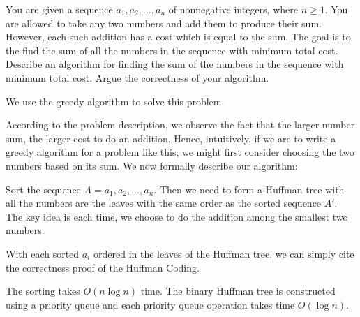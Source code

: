 \newpage
{} %

\problemdes

You are given a sequence $a_1, a_2, \dots, a_n$ of nonnegative integers, where $n \geq 1$. You are allowed to take any two numbers and add them to produce their sum. However, each such addition has a cost which is equal to the sum. The goal is to the find the sum of all the numbers in the sequence with minimum total cost. Describe an algorithm for finding the sum of the numbers in the sequence with minimum total cost. Argue the correctness of your algorithm.

\solution


We use the greedy algorithm to solve this problem.

According to the problem description, we observe the fact that the larger number sum, the larger cost to do an addition. Hence, intuitively, if we are to write a greedy algorithm for a problem like this, we might first consider choosing the two numbers based on its sum. We now formally describe our algorithm:

Sort the sequence $A= a_1, a_2, \dots, a_n$. Then we need to form a Huffman tree with all the numbers are the leaves with the same order as the sorted sequence $A'$. The key idea is each time, we choose to do the addition among the smallest two numbers.



With each sorted $a_i$ ordered in the leaves of the Huffman tree, we can simply cite the correctness proof of the Huffman Coding. 


The sorting takes $O(n\log n)$ time. The binary Huffman tree is constructed using a priority queue and each priority queue operation takes time $O(\log n)$.



